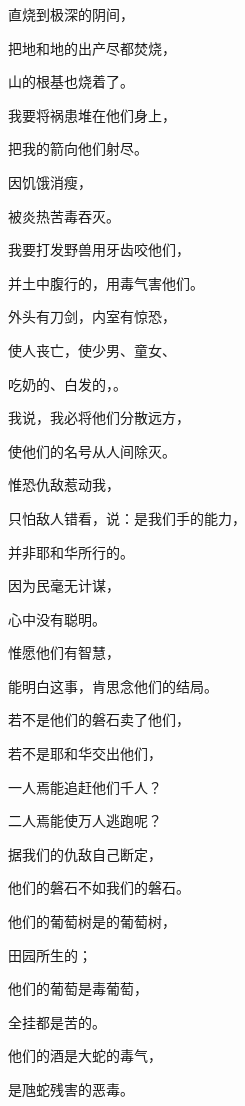 {\par }{\Q 直烧到极深的阴间，
\par }{\Q 把地和地的出产尽都焚烧，
\par }{\Q 山的根基也烧着了。
\par }{\BB \par }{\Q {}我要将祸患堆在他们身上，
\par }{\Q 把我的箭向他们射尽。
\par }{\Q {}因饥饿消瘦，
\par }{\Q 被炎热苦毒吞灭。
\par }{\Q 我要打发野兽用牙齿咬他们，
\par }{\Q 并土中腹行的，用毒气害他们。
\par }{\Q {}外头有刀剑，内室有惊恐，
\par }{\Q 使人丧亡，使少男、童女、
\par }{\Q 吃奶的、白发的，{}。
\par }{\Q {}我说，我必将他们分散远方，
\par }{\Q 使他们的名号从人间除灭。
\par }{\Q {}惟恐仇敌惹动我，
\par }{\Q 只怕敌人错看，说：是我们手的能力，
\par }{\Q 并非耶和华所行的。
\par }{\BB \par }{\Q {}因为{}民毫无计谋，
\par }{\Q 心中没有聪明。
\par }{\Q {}惟愿他们有智慧，
\par }{\Q 能明白这事，肯思念他们的结局。
\par }{\Q {}若不是他们的磐石卖了他们，
\par }{\Q 若不是耶和华交出他们，
\par }{\Q 一人焉能追赶他们千人？
\par }{\Q 二人焉能使万人逃跑呢？
\par }{\Q {}据我们的仇敌自己断定，
\par }{\Q 他们的磐石不如我们的磐石。
\par }{\Q {}他们的葡萄树是{}的葡萄树，
\par }{田园所生的；
\par }{\Q 他们的葡萄是毒葡萄，
\par }{\Q 全挂都是苦的。
\par }{\Q {}他们的酒是大蛇的毒气，
\par }{\Q 是虺蛇残害的恶毒。
}
